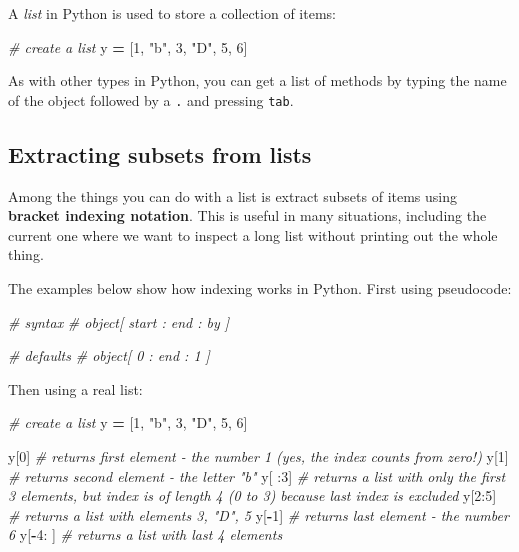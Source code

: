 \documentclass[
]{book}
\newenvironment{Shaded}{\begin{snugshade}}{\end{snugshade}}
\newcommand{\CommentTok}[1]{\textcolor[rgb]{0.56,0.35,0.01}{\textit{#1}}}
\newcommand{\DecValTok}[1]{\textcolor[rgb]{0.00,0.00,0.81}{#1}}
\newcommand{\NormalTok}[1]{#1}
\newcommand{\OperatorTok}[1]{\textcolor[rgb]{0.81,0.36,0.00}{\textbf{#1}}}
\newcommand{\StringTok}[1]{\textcolor[rgb]{0.31,0.60,0.02}{#1}}
\begin{document}
A \emph{list} in Python is used to store a collection of items:

\begin{Shaded}
\begin{Highlighting}[]
\CommentTok{# create a list}
\NormalTok{y }\OperatorTok{=}\NormalTok{ [}\DecValTok{1}\NormalTok{, }\StringTok{"b"}\NormalTok{, }\DecValTok{3}\NormalTok{, }\StringTok{"D"}\NormalTok{, }\DecValTok{5}\NormalTok{, }\DecValTok{6}\NormalTok{]}
\end{Highlighting}
\end{Shaded}

As with other types in Python, you can get a list of methods by typing the name of the object followed by a \texttt{.} and pressing \texttt{tab}.

\hypertarget{extracting-subsets-from-lists}{%
\subsection{Extracting subsets from lists}\label{extracting-subsets-from-lists}}

Among the things you can do with a list is extract subsets of items using \textbf{bracket indexing notation}. This is useful in many situations, including the current one where we want to inspect a long list without printing out the whole thing.

The examples below show how indexing works in Python. First using pseudocode:

\begin{Shaded}
\begin{Highlighting}[]
\CommentTok{# syntax}
\CommentTok{# object[ start : end : by ]}

\CommentTok{# defaults}
\CommentTok{# object[ 0 : end : 1 ]}
\end{Highlighting}
\end{Shaded}

Then using a real list:

\begin{Shaded}
\begin{Highlighting}[]
\CommentTok{# create a list}
\NormalTok{y }\OperatorTok{=}\NormalTok{ [}\DecValTok{1}\NormalTok{, }\StringTok{"b"}\NormalTok{, }\DecValTok{3}\NormalTok{, }\StringTok{"D"}\NormalTok{, }\DecValTok{5}\NormalTok{, }\DecValTok{6}\NormalTok{]}

\NormalTok{y[}\DecValTok{0}\NormalTok{] }\CommentTok{# returns first element - the number 1 (yes, the index counts from zero!)}
\NormalTok{y[}\DecValTok{1}\NormalTok{] }\CommentTok{# returns second element - the letter "b"}
\NormalTok{y[ :}\DecValTok{3}\NormalTok{] }\CommentTok{# returns a list with only the first 3 elements, but index is of length 4 (0 to 3) because last index is excluded}
\NormalTok{y[}\DecValTok{2}\NormalTok{:}\DecValTok{5}\NormalTok{] }\CommentTok{# returns a list with elements 3, "D", 5}
\NormalTok{y[}\OperatorTok{-}\DecValTok{1}\NormalTok{] }\CommentTok{# returns last element - the number 6 }
\NormalTok{y[}\OperatorTok{-}\DecValTok{4}\NormalTok{: ] }\CommentTok{# returns a list with last 4 elements}
\end{Highlighting}
\end{Shaded}
\end{document}
